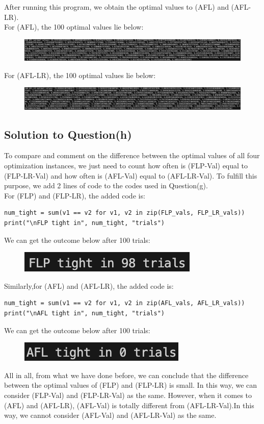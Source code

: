 \documentclass[a4paper]{article}
\begin{document}
After running this program, we obtain the optimal values to (AFL) and (AFL-LR).\\
For (AFL), the 100 optimal values lie below:\\
\begin{figure}[H]
    \centering
    \includegraphics[width=1\linewidth]{AFL.png}
\end{figure}
For (AFL-LR), the 100 optimal values lie below:\\
\begin{figure}[H]
    \centering
    \includegraphics[width=1\linewidth]{AFL-LR.png}
\end{figure}

\subsection{Solution to Question(h)}
To compare and comment on the difference between the optimal values of all four optimization instances, we just need to count how often is (FLP-Val) equal to (FLP-LR-Val) and how often is (AFL-Val) equal to (AFL-LR-Val). To fulfill this purpose, we add 2 lines of code to the codes used in Question(g).\\
For (FLP) and (FLP-LR), the added code is:
\begin{verbatim}
num_tight = sum(v1 == v2 for v1, v2 in zip(FLP_vals, FLP_LR_vals))
print("\nFLP tight in", num_tight, "trials")
\end{verbatim}
We can get the outcome below after 100 trials:
\begin{figure}[H]
    \flushleft
    \includegraphics[width=0.25\linewidth]{FLP-Often.png}
\end{figure}
Similarly,for (AFL) and (AFL-LR), the added code is:
\begin{verbatim}
num_tight = sum(v1 == v2 for v1, v2 in zip(AFL_vals, AFL_LR_vals))
print("\nAFL tight in", num_tight, "trials")
\end{verbatim}
We can get the outcome below after 100 trials:
\begin{figure}[H]
    \flushleft
    \includegraphics[width=0.25\linewidth]{AFL-Often.png}
\end{figure}
All in all, from what we have done before, we can conclude that the difference between the optimal values of (FLP) and (FLP-LR) is small. In this way, we can consider (FLP-Val) and (FLP-LR-Val) as the same. However, when it comes to (AFL) and (AFL-LR), (AFL-Val) is totally different from (AFL-LR-Val).In this way, we cannot consider (AFL-Val) and (AFL-LR-Val) as the same.
\end{document}
